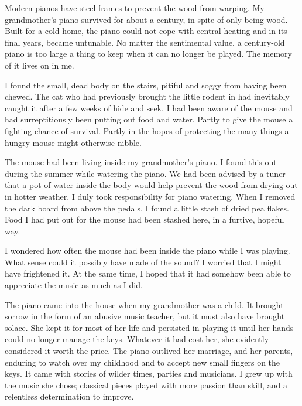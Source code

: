 

\prelude

Modern pianos have steel frames to prevent the wood from warping. My
grandmother's piano survived for about a century, in spite of only
being wood. Built for a cold home, the piano could not cope with
central heating and in its final years, became untunable. No matter
the sentimental value, a century-old piano is too large a thing to
keep when it can no longer be played. The memory of it lives on in me.

\fugue

I found the small, dead body on the stairs, pitiful and soggy from
having been chewed. The cat who had previously brought the little
rodent in had inevitably caught it after a few weeks of hide and
seek. I had been aware of the mouse and had surreptitiously been
putting out food and water. Partly to give the mouse a fighting chance
of survival. Partly in the hopes of protecting the many things a
hungry mouse might otherwise nibble.

The mouse had been living inside my grandmother's piano. I found this
out during the summer while watering the piano. We had been advised by
a tuner that a pot of water inside the body would help prevent the
wood from drying out in hotter weather. I duly took responsibility for
piano watering. When I removed the dark board from above the pedals, I
found a little stash of dried pea flakes. Food I had put out for the
mouse had been stashed here, in a furtive, hopeful way.

I wondered how often the mouse had been inside the piano while I was
playing. What sense could it possibly have made of the sound? I
worried that I might have frightened it. At the same time, I hoped
that it had somehow been able to appreciate the music as much as I
did.

The piano came into the house when my grandmother was a child. It
brought sorrow in the form of an abusive music teacher, but it must
also have brought solace. She kept it for most of her life and
persisted in playing it until her hands could no longer manage the
keys. Whatever it had cost her, she evidently considered it worth the
price. The piano outlived her marriage, and her parents, enduring to
watch over my childhood and to accept new small fingers on the
keys. It came with stories of wilder times, parties and musicians. I
grew up with the music she chose; classical pieces played with more
passion than skill, and a relentless determination to improve.

